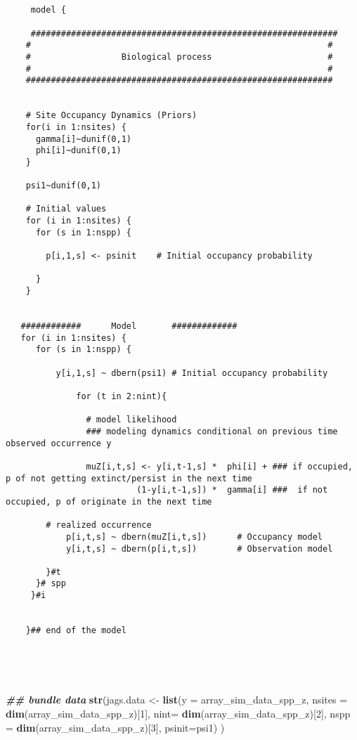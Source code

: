 \documentclass[
]{article}
\newenvironment{Shaded}{\begin{snugshade}}{\end{snugshade}}
\newcommand{\AttributeTok}[1]{\textcolor[rgb]{0.13,0.29,0.53}{#1}}
\newcommand{\DecValTok}[1]{\textcolor[rgb]{0.00,0.00,0.81}{#1}}
\newcommand{\DocumentationTok}[1]{\textcolor[rgb]{0.56,0.35,0.01}{\textbf{\textit{#1}}}}
\newcommand{\FunctionTok}[1]{\textcolor[rgb]{0.13,0.29,0.53}{\textbf{#1}}}
\newcommand{\NormalTok}[1]{#1}
\newcommand{\OtherTok}[1]{\textcolor[rgb]{0.56,0.35,0.01}{#1}}
\begin{document}
\begin{verbatim}

   
     model {
    
     #############################################################
    #                                                           #
    #                  Biological process                       #
    #                                                           #
    #############################################################
    
    
    # Site Occupancy Dynamics (Priors)
    for(i in 1:nsites) {
      gamma[i]~dunif(0,1)
      phi[i]~dunif(0,1)
    }
    
    psi1~dunif(0,1)     
         
    # Initial values
    for (i in 1:nsites) {
      for (s in 1:nspp) {
    
        p[i,1,s] <- psinit    # Initial occupancy probability
     
      }
    }
    

   ############      Model       #############
   for (i in 1:nsites) {
      for (s in 1:nspp) {
      
          y[i,1,s] ~ dbern(psi1) # Initial occupancy probability
    
              for (t in 2:nint){
            
                # model likelihood
                ### modeling dynamics conditional on previous time observed occurrence y
                
                muZ[i,t,s] <- y[i,t-1,s] *  phi[i] + ### if occupied, p of not getting extinct/persist in the next time
                          (1-y[i,t-1,s]) *  gamma[i] ###  if not occupied, p of originate in the next time
                
        # realized occurrence
            p[i,t,s] ~ dbern(muZ[i,t,s])      # Occupancy model
            y[i,t,s] ~ dbern(p[i,t,s])        # Observation model
    
        }#t
      }# spp
     }#i
    
    
    }## end of the model
    
    
    
    
\end{verbatim}

\begin{Shaded}
\begin{Highlighting}[]
\DocumentationTok{\#\# bundle data}
\FunctionTok{str}\NormalTok{(jags.data }\OtherTok{\textless{}{-}} \FunctionTok{list}\NormalTok{(}\AttributeTok{y =}\NormalTok{ array\_sim\_data\_spp\_z,}
                      \AttributeTok{nsites =} \FunctionTok{dim}\NormalTok{(array\_sim\_data\_spp\_z)[}\DecValTok{1}\NormalTok{],}
                      \AttributeTok{nint=} \FunctionTok{dim}\NormalTok{(array\_sim\_data\_spp\_z)[}\DecValTok{2}\NormalTok{],}
                      \AttributeTok{nspp =} \FunctionTok{dim}\NormalTok{(array\_sim\_data\_spp\_z)[}\DecValTok{3}\NormalTok{],}
                      \AttributeTok{psinit=}\NormalTok{psi1)}
\NormalTok{)}
\end{Highlighting}
\end{Shaded}
\end{document}
